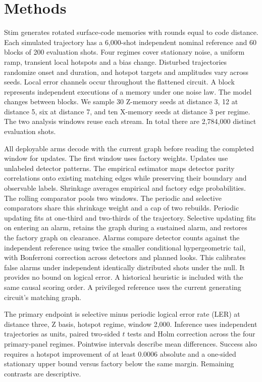 \documentclass[10pt]{article}
\begin{document}
\section{Methods}
Stim generates rotated surface-code memories with rounds equal to code distance. Each simulated trajectory has a 6,000-shot independent nominal reference and 60 blocks of 200 evaluation shots. Four regimes cover stationary noise, a uniform ramp, transient local hotspots and a bias change. Disturbed trajectories randomize onset and duration, and hotspot targets and amplitudes vary across seeds. Local error channels occur throughout the flattened circuit. A block represents independent executions of a memory under one noise law. The model changes between blocks. We sample 30 Z-memory seeds at distance 3, 12 at distance 5, six at distance 7, and ten X-memory seeds at distance 3 per regime. The two analysis windows reuse each stream. In total there are 2,784,000 distinct evaluation shots.

All deployable arms decode with the current graph before reading the completed window for updates. The first window uses factory weights. Updates use unlabeled detector patterns. The empirical estimator maps detector parity correlations onto existing matching edges while preserving their boundary and observable labels. Shrinkage averages empirical and factory edge probabilities. The rolling comparator pools two windows. The periodic and selective comparators share this shrinkage weight and a cap of two rebuilds. Periodic updating fits at one-third and two-thirds of the trajectory. Selective updating fits on entering an alarm, retains the graph during a sustained alarm, and restores the factory graph on clearance. Alarms compare detector counts against the independent reference using twice the smaller conditional hypergeometric tail, with Bonferroni correction across detectors and planned looks. This calibrates false alarms under independent identically distributed shots under the null. It provides no bound on logical error. A historical heuristic is included with the same causal scoring order. A privileged reference uses the current generating circuit's matching graph.

The primary endpoint is selective minus periodic logical error rate (LER) at distance three, Z basis, hotspot regime, window 2,000. Inference uses independent trajectories as units, paired two-sided $t$ tests and Holm correction across the four primary-panel regimes. Pointwise intervals describe mean differences. Success also requires a hotspot improvement of at least 0.0006 absolute and a one-sided stationary upper bound versus factory below the same margin. Remaining contrasts are descriptive.
\end{document}
